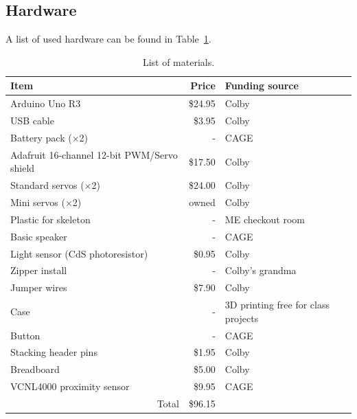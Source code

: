 \documentclass{article}
\begin{document}
\subsection{Hardware}
A list of used hardware can be found in Table~\ref{tab:materials}.
\begin{table}[hbt]
    \centering
    \begin{tabular}{lrl}
        \toprule
        Item & Price & Funding source \\
        \midrule
        Arduino Uno R3                              & \$24.95 & Colby \\
        USB cable                                   & \$3.95  & Colby \\
        Battery pack ($\times$2)                    & -       & CAGE \\
        Adafruit 16-channel 12-bit PWM/Servo shield & \$17.50 & Colby \\
        Standard servos ($\times$2)                 & \$24.00 & Colby \\ 
        Mini servos ($\times$2)                     & owned   & Colby \\
        Plastic for skeleton                        & -       & ME checkout room \\
        Basic speaker                               & -       & CAGE \\
        Light sensor (CdS photoresistor)            & \$0.95  & Colby \\
        Zipper install                              & -       & Colby's grandma \\
        Jumper wires                                & \$7.90  & Colby \\
        Case                                        & -       & 3D printing free for class projects \\
        Button                                      & -       & CAGE \\
        Stacking header pins                        & \$1.95  & Colby \\
        Breadboard                                  & \$5.00  & Colby \\
        VCNL4000 proximity sensor                   & \$9.95  & CAGE \\
        \cmidrule(r){2-2}
        \multicolumn{1}{r}{Total}                   & \$96.15 \\
        \bottomrule
    \end{tabular}
    \caption{List of materials.}
    \label{tab:materials}
\end{table}
\end{document}
